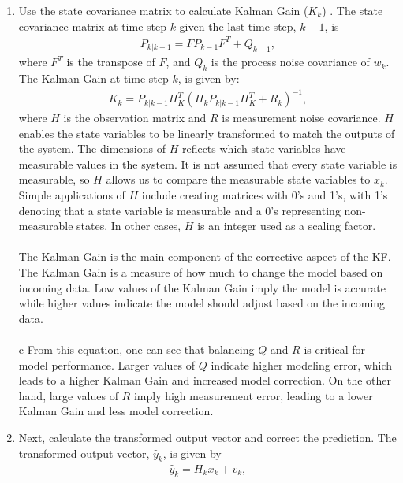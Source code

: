 \begin{enumerate}
  \item Use the state covariance matrix to calculate Kalman Gain ($K_k$) . The state covariance matrix at time step $k$ given the last time step, $k-1$, is 
    \begin{align*} 
        P_{k | k -1} = F P_{k - 1} F^T + Q_{k-1}, 
    \end{align*}
    where $F^T$ is the transpose of $F$, and $Q_{k}$ is the process noise covariance of $w_k$.
    The Kalman Gain at time step $k$, is given by:
    \begin{align*} 
        K_k = P_{k | k - 1} H^T_K (H_k P_{k | k - 1} H^T_K + R_k)^{-1},
    \end{align*}
      where $H$ is the observation matrix and $R$ is measurement noise covariance. 
      $H$ enables the state variables to be linearly transformed to match the outputs of the system. The dimensions of $H$ reflects which state variables have measurable values in the system. It is not assumed that every state variable is measurable, so $H$ allows us to compare the measurable state variables to $x_k$. Simple applications of $H$ include creating matrices with 0's and 1's, with 1's denoting that a state variable is measurable and a 0's representing non-measurable states. In other cases, $H$ is an integer used as a scaling factor. \\ \\
     The Kalman Gain is the main component of the corrective aspect of the KF. The Kalman Gain is a measure of how much to change the model based on incoming data. Low values of the Kalman Gain imply the model is accurate while higher values indicate the model should adjust based on the incoming data.  \\ \\c
     From this equation, one can see that balancing $Q$ and $R$ is critical for model performance. Larger values of $Q$ indicate higher modeling error, which leads to a higher Kalman Gain and increased model correction. On the other hand, large values of $R$ imply high measurement error, leading to a lower Kalman Gain and less model correction. 
     
   
    \item Next, calculate the transformed output vector and correct the prediction. The transformed output vector, $\hat y_k$, is given by
    \begin{align*}
        \hat y_k = H_k x_k + v_k,
    \end{align*}
    

\end{enumerate}
